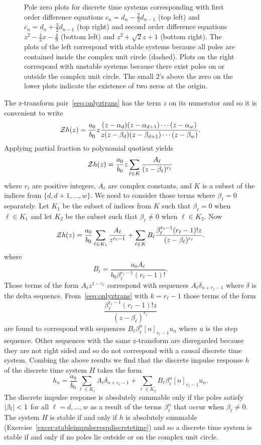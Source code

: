 {\begin{figure}[p]
\begin{tikzpicture}[scale=\zscale]
  \end{tikzpicture}
  \caption{Pole zero plots for discrete time systems corresponding with first order difference equations $c_n = d_n - \tfrac{2}{3} d_{n-1}$ (top left) and $c_n = d_n + \tfrac{3}{2} d_{n-1}$ (top right) and second order difference equations $z^2 - \tfrac{4}{3} x - \tfrac{4}{9}$ (bottom left) and $z^2 + \sqrt{2}z + 1$ (bottom right).  The plots of the left correspond with stable systems because all poles are contained inside the complex unit circle (dashed).  Plots on the right correspond with unstable systems because there exist poles on or outside the complex unit circle.  The small $2$'s above the zero on the lower plots indicate the existence of two zeros at the origin.}\label{fig:polezeroplotdisctime}
\end{figure}
}

The z-transform pair~\eqref{eeq:onlyztrans} has the term $z$ on its numerator and so it is convenient to write
\[
\calZ h(z) = \frac{a_0}{b_0} z \frac{(z-\alpha_d)(z - \alpha_{d+1})\cdots(z - \alpha_{w})}{z(z-\beta_d)(z - \beta_{d+1})\cdots(z - \beta_{w})}.
\]
Applying partial fraction to polynomial quotient yields
\[
\calZ h(z) = \frac{a_0}{b_0} z \sum_{\ell \in K} \frac{A_\ell }{(z - \beta_\ell)^{r_\ell}}
\] 
where $r_\ell$ are positive integers, $A_\ell$ are complex constants, and $K$ is a subset of the indices from $\{d,d+1,\dots,w\}$.  We need to consider those terms where $\beta_\ell = 0$ separately.  Let $K_1$ be the subset of indices from $K$ such that $\beta_\ell = 0$ when $\ell \in K_1$ and let $K_2$ be the subset such that $\beta_\ell \neq 0$ when $\ell \in K_2$.  Now 
\[
\calZ h(z) = \frac{a_0}{b_0} \sum_{\ell \in K_1} \frac{A_\ell }{z^{r_\ell-1}} + \sum_{\ell \in K} B_\ell \frac{  \beta_\ell^{r_\ell-1} (r_\ell-1)! z }{(z - \beta_\ell)^{r_\ell}}.
\] 
where
\[
B_\ell = \frac{a_0 A_\ell}{b_0 \beta_\ell^{r_\ell-1} (r_\ell-1)! }.
\] 
Those terms of the form $A_\ell z^{1 - r_\ell}$ correspond with sequences $A_\ell \delta_{n+r_\ell-1}$ where $\delta$ is the delta sequence.  From~\eqref{eeq:onlyztrans} with $k = r_\ell - 1$ those terms of the form 
\[
\frac{\beta_\ell^{r_\ell-1} (r_\ell-1)! z }{(z - \beta_\ell)^{r_\ell}}
\]
are found to correspond with sequences $B_\ell \beta_\ell^n [n]_{r_\ell-1} u_n$ where $u$ is the step sequence.  Other sequences with the same z-transform are disregarded because they are not right sided and so do not correspond with a causal discrete time system.  Combing the above results we find that the discrete impulse response $h$ of the discrete time system $H$ takes the form
\[
h_n = \frac{a_0}{b_0} \sum_{\ell \in K_1} A_\ell \delta_{n+r_\ell-1} + \sum_{\ell \in K_2} B_\ell \beta_\ell^n [n]_{r_\ell-1} u_n.
\]
The discrete impulse response is absolutely summable only if the poles satisfy $\abs{\beta_\ell} < 1$ for all $\ell = d,\dots,w$ as a result of the terms $\beta_\ell^n$ that occur when $\beta_\ell \neq 0$.  The system $H$ is stable if and only if $h$ is absolutely summable (Exercise~\ref{excer:stableimpulserespdiscretetime}) and so a discrete time system is stable if and only if no poles lie outside or on the complex unit circle.

